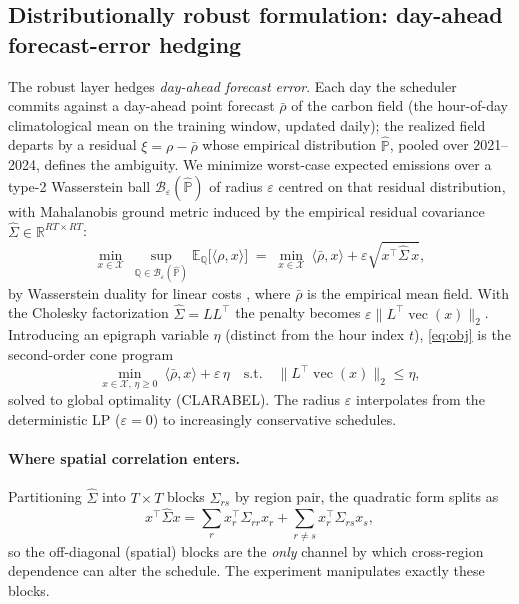 \documentclass[10pt,twocolumn]{article}
\newcommand{\vecx}{\operatorname{vec}}
\newcommand{\R}{\mathbb{R}}
\newcommand{\E}{\mathbb{E}}
\begin{document}
\subsection{Distributionally robust formulation: day-ahead forecast-error hedging}
The robust layer hedges \emph{day-ahead forecast error}. Each day the scheduler commits
against a day-ahead point forecast $\bar\rho$ of the carbon field (the hour-of-day
climatological mean on the training window, updated daily); the realized field departs
by a residual $\xi=\rho-\bar\rho$ whose empirical distribution $\hat{\mathbb P}$,
pooled over 2021--2024, defines the ambiguity. We minimize worst-case expected
emissions over a type-2 Wasserstein ball $\mathcal{B}_\varepsilon(\hat{\mathbb P})$ of
radius $\varepsilon$ centred on that residual distribution, with Mahalanobis ground
metric induced by the empirical residual covariance $\hat\Sigma\in\R^{RT\times RT}$:
\begin{equation}
\min_{x\in\mathcal{X}}\ \sup_{\mathbb{Q}\in\mathcal{B}_\varepsilon(\hat{\mathbb{P}})}
\E_{\mathbb{Q}}\big[\langle\rho,x\rangle\big]
\;=\;
\min_{x\in\mathcal{X}}\ \langle\bar\rho,x\rangle
+\varepsilon\sqrt{x^\top\hat\Sigma\,x},
\label{eq:obj}
\end{equation}
by Wasserstein duality for linear costs \citep{esfahani2018,blanchet2019}, where
$\bar\rho$ is the empirical mean field. With the Cholesky factorization
$\hat\Sigma=LL^\top$ the penalty becomes $\varepsilon\lVert
L^\top\vecx(x)\rVert_2$. Introducing an epigraph variable $\eta$ (distinct from the
hour index $t$), \eqref{eq:obj} is the second-order cone program
\begin{equation}
\min_{x\in\mathcal X,\,\eta\ge0}\ \langle\bar\rho,x\rangle+\varepsilon\,\eta
\quad\text{s.t.}\quad \big\lVert L^\top\vecx(x)\big\rVert_2\le\eta,
\label{eq:socp}
\end{equation}
solved to global optimality (CLARABEL). The radius $\varepsilon$ interpolates from
the deterministic LP ($\varepsilon=0$) to increasingly conservative schedules.

\paragraph{Where spatial correlation enters.}
Partitioning $\hat\Sigma$ into $T\times T$ blocks $\Sigma_{rs}$ by region pair, the
quadratic form splits as
\begin{equation}
x^\top\hat\Sigma x=\sum_r x_r^\top\Sigma_{rr}x_r
+\sum_{r\neq s}x_r^\top\Sigma_{rs}x_s,
\label{eq:quad}
\end{equation}
so the off-diagonal (spatial) blocks are the \emph{only} channel by which
cross-region dependence can alter the schedule. The experiment manipulates exactly
these blocks.
\end{document}
